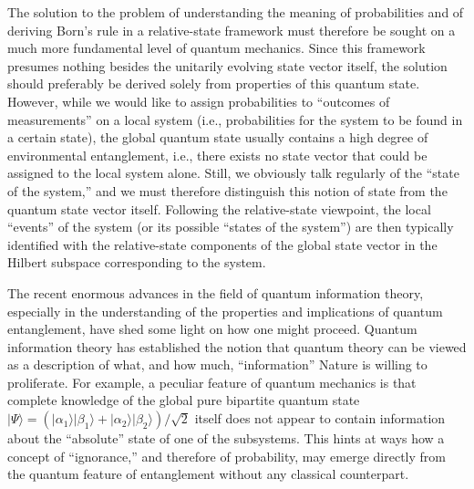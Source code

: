 \documentclass[12pt,aps,floatfix,amsmath,amssymb,showpacs,nofootinbib]{revtex4-2}
\newcommand{\ket}[1]{\ensuremath{|{#1\rangle}}}
\begin{document}
The solution to the problem of understanding the meaning of
probabilities and of deriving Born's rule in a relative-state
framework must therefore be sought on a much more fundamental level of
quantum mechanics. Since this framework presumes nothing besides the
unitarily evolving state vector itself, the solution should preferably
be derived solely from properties of this quantum state. However,
while we would like to assign probabilities to ``outcomes of
measurements'' on a local system (i.e., probabilities for the system
to be found in a certain state), the global quantum state usually
contains a high degree of environmental entanglement, i.e., there
exists no state vector that could be assigned to the local system
alone.  Still, we obviously talk regularly of the ``state of the
system,'' and we must therefore distinguish this notion of state from
the quantum state vector itself. Following the relative-state
viewpoint, the local ``events'' of the system (or its possible
``states of the system'') are then typically identified with the
relative-state components of the global state vector in the Hilbert
subspace corresponding to the system.

The recent enormous advances in the field of quantum information
theory, especially in the understanding of the properties and
implications of quantum entanglement, have shed some light on how one
might proceed. Quantum information theory has established the notion
that quantum theory can be viewed as a description of what, and how
much, ``information'' Nature is willing to proliferate. For example, a
peculiar feature of quantum mechanics is that complete knowledge of
the global pure bipartite quantum state $\ket{\Psi} = \left(
  \ket{\alpha_1}\ket{\beta_1} + \ket{\alpha_2}\ket{\beta_2}\right)
/\sqrt{2}$ itself does not appear to contain information about the
``absolute'' state of one of the subsystems.  This hints at ways how a
concept of ``ignorance,'' and therefore of probability, may emerge
directly from the quantum feature of entanglement without any
classical counterpart.
\end{document}
